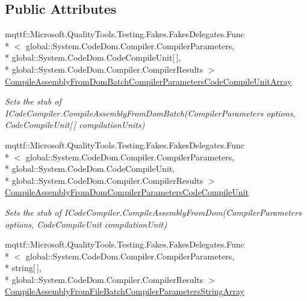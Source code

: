 \subsection*{Public Attributes}
\begin{DoxyCompactItemize}
\item 
mqttf\-::\-Microsoft.\-Quality\-Tools.\-Testing.\-Fakes.\-Fakes\-Delegates.\-Func\\*
$<$ global\-::\-System.\-Code\-Dom.\-Compiler.\-Compiler\-Parameters, \\*
global\-::\-System.\-Code\-Dom.\-Code\-Compile\-Unit\mbox{[}$\,$\mbox{]}, \\*
global\-::\-System.\-Code\-Dom.\-Compiler.\-Compiler\-Results $>$ \hyperlink{class_system_1_1_code_dom_1_1_compiler_1_1_fakes_1_1_stub_i_code_compiler_ae672c096341658599d5dfe926eba52d4}{Compile\-Assembly\-From\-Dom\-Batch\-Compiler\-Parameters\-Code\-Compile\-Unit\-Array}
\begin{DoxyCompactList}\small\item\em Sets the stub of I\-Code\-Compiler.\-Compile\-Assembly\-From\-Dom\-Batch(\-Compiler\-Parameters options, Code\-Compile\-Unit\mbox{[}$\,$\mbox{]} compilation\-Units)\end{DoxyCompactList}\item 
mqttf\-::\-Microsoft.\-Quality\-Tools.\-Testing.\-Fakes.\-Fakes\-Delegates.\-Func\\*
$<$ global\-::\-System.\-Code\-Dom.\-Compiler.\-Compiler\-Parameters, \\*
global\-::\-System.\-Code\-Dom.\-Code\-Compile\-Unit, \\*
global\-::\-System.\-Code\-Dom.\-Compiler.\-Compiler\-Results $>$ \hyperlink{class_system_1_1_code_dom_1_1_compiler_1_1_fakes_1_1_stub_i_code_compiler_a57144a07c3b1f6bf61c03d7e68086f7f}{Compile\-Assembly\-From\-Dom\-Compiler\-Parameters\-Code\-Compile\-Unit}
\begin{DoxyCompactList}\small\item\em Sets the stub of I\-Code\-Compiler.\-Compile\-Assembly\-From\-Dom(\-Compiler\-Parameters options, Code\-Compile\-Unit compilation\-Unit)\end{DoxyCompactList}\item 
mqttf\-::\-Microsoft.\-Quality\-Tools.\-Testing.\-Fakes.\-Fakes\-Delegates.\-Func\\*
$<$ global\-::\-System.\-Code\-Dom.\-Compiler.\-Compiler\-Parameters, \\*
string\mbox{[}$\,$\mbox{]}, \\*
global\-::\-System.\-Code\-Dom.\-Compiler.\-Compiler\-Results $>$ \hyperlink{class_system_1_1_code_dom_1_1_compiler_1_1_fakes_1_1_stub_i_code_compiler_ac44b5a4d9b6a142d9ff1768099825665}{Compile\-Assembly\-From\-File\-Batch\-Compiler\-Parameters\-String\-Array}

\end{DoxyCompactItemize}
